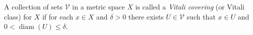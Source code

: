 \documentclass[12pt]{article}
\begin{document}
A collection of sets $\mathscr{V}$ in a metric space $X$ is called a \emph{Vitali covering} (or Vitali class) for $X$ if for each $x\in X$ and $\delta>0$ there exists $U\in \mathscr{V}$ such that $x\in U$ and $0<\operatorname{diam}(U)\leq \delta$.
\end{document}
